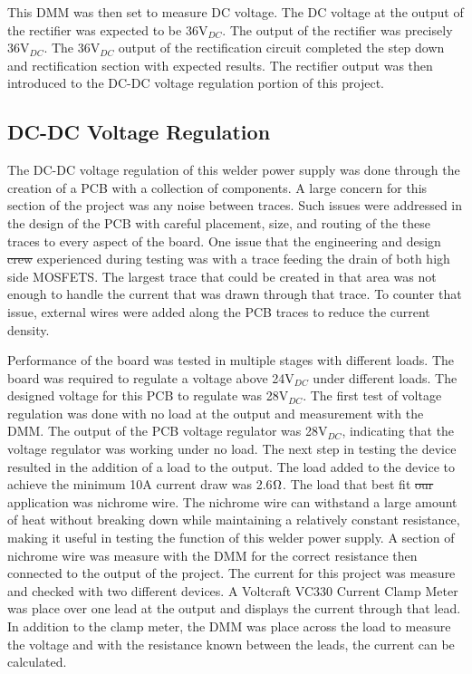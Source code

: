 \documentclass[11pt]{article}
\providecommand{\DIFadd}[1]{{\protect\color{blue}\uwave{#1}}} %
\providecommand{\DIFdel}[1]{{\protect\color{red}\sout{#1}}}                      %
\providecommand{\DIFaddbegin}{} %
\providecommand{\DIFaddend}{} %
\providecommand{\DIFdelbegin}{} %
\providecommand{\DIFdelend}{} %
\newcommand{\DIFscaledelfig}{0.5}
\newlength{\DIFdelgraphicswidth} %
\newlength{\DIFdelgraphicsheight} %
\newcommand{\DIFaddincludegraphics}[2][]{{\color{blue}\fbox{\DIFOincludegraphics[#1]{#2}}}} %
\newcommand{\DIFdelincludegraphics}[2][]{%
\sbox{\DIFdelgraphicsbox}{\DIFOincludegraphics[#1]{#2}}%
\settoboxwidth{\DIFdelgraphicswidth}{\DIFdelgraphicsbox} %
\settoboxtotalheight{\DIFdelgraphicsheight}{\DIFdelgraphicsbox} %
\scalebox{\DIFscaledelfig}{%
\parbox[b]{\DIFdelgraphicswidth}{\usebox{\DIFdelgraphicsbox}\\[-\baselineskip] \rule{\DIFdelgraphicswidth}{0em}}\llap{\resizebox{\DIFdelgraphicswidth}{\DIFdelgraphicsheight}{%
\setlength{\unitlength}{\DIFdelgraphicswidth}%
\begin{picture}(1,1)%
\thicklines\linethickness{2pt} %
{\color[rgb]{1,0,0}\put(0,0){\framebox(1,1){}}}%
{\color[rgb]{1,0,0}\put(0,0){\line( 1,1){1}}}%
{\color[rgb]{1,0,0}\put(0,1){\line(1,-1){1}}}%
\end{picture}%
}\hspace*{3pt}}} %
} %
\DeclareRobustCommand{\DIFaddbegin}{\DIFOaddbegin \let\includegraphics\DIFaddincludegraphics} %
\DeclareRobustCommand{\DIFaddend}{\DIFOaddend \let\includegraphics\DIFOincludegraphics} %
\DeclareRobustCommand{\DIFdelbegin}{\DIFOdelbegin \let\includegraphics\DIFdelincludegraphics} %
\DeclareRobustCommand{\DIFdelend}{\DIFOaddend \let\includegraphics\DIFOincludegraphics} %
\begin{document}
    This DMM was then set to measure DC voltage. The DC voltage at the output of the rectifier was expected to be 36V$_{DC}$. The output of the rectifier was precisely 36V$_{DC}$. The 36V$_{DC}$ output of the rectification circuit completed the step down and rectification section with expected results. The rectifier output was then introduced to the DC-DC voltage regulation portion of this project. 

        
    \subsection{DC-DC Voltage Regulation}
       The DC-DC voltage regulation of this welder power supply was done through the creation of a PCB with a collection of components. A large concern for this section of the project was any noise between traces. Such issues were addressed in the design of the PCB with careful placement, size, and routing of the these traces to every aspect of the board. One issue that the engineering and design \DIFdelbegin \DIFdel{crew }\DIFdelend \DIFaddbegin \DIFadd{team }\DIFaddend experienced during testing was with a trace feeding the drain of both high side MOSFETS. The largest trace that could be created in that area was not enough to handle the current that was drawn through that trace. To counter that issue, external wires were added along the PCB traces to reduce the current density. 

       Performance of the board was tested in multiple stages with different loads. The board was required to regulate a voltage above 24V$_{DC}$ under different loads. The designed voltage for this PCB to regulate was 28V$_{DC}$. The first test of voltage regulation was done with no load at the output and measurement with the DMM. The output of the PCB voltage regulator was 28V$_{DC}$, indicating that the voltage regulator was working under no load. The next step in testing the device resulted in the addition of a load to the output. The load added to the device to achieve the minimum 10A current draw was 2.6$\ohm$. The load that best fit \DIFdelbegin \DIFdel{our }\DIFdelend \DIFaddbegin \DIFadd{the }\DIFaddend application was nichrome wire. The nichrome wire can withstand a large amount of heat without breaking down while maintaining a relatively constant resistance, making it useful in testing the function of this welder power supply. A section of nichrome wire was measure with the DMM for the correct resistance then connected to the output of the project. The current for this project was measure and checked with two different devices. A Voltcraft VC330 Current Clamp Meter was place over one lead at the output and displays the current through that lead. In addition to the clamp meter, the DMM was place across the load to measure the voltage and with the resistance known between the leads, the current can be calculated. 
\end{document}
